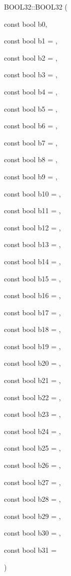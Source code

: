 {\footnotesize\ttfamily B\+O\+O\+L32\+::\+B\+O\+O\+L32 (\begin{DoxyParamCaption}\item[{const bool}]{b0,  }\item[{const bool}]{b1 = {},  }\item[{const bool}]{b2 = {},  }\item[{const bool}]{b3 = {},  }\item[{const bool}]{b4 = {},  }\item[{const bool}]{b5 = {},  }\item[{const bool}]{b6 = {},  }\item[{const bool}]{b7 = {},  }\item[{const bool}]{b8 = {},  }\item[{const bool}]{b9 = {},  }\item[{const bool}]{b10 = {},  }\item[{const bool}]{b11 = {},  }\item[{const bool}]{b12 = {},  }\item[{const bool}]{b13 = {},  }\item[{const bool}]{b14 = {},  }\item[{const bool}]{b15 = {},  }\item[{const bool}]{b16 = {},  }\item[{const bool}]{b17 = {},  }\item[{const bool}]{b18 = {},  }\item[{const bool}]{b19 = {},  }\item[{const bool}]{b20 = {},  }\item[{const bool}]{b21 = {},  }\item[{const bool}]{b22 = {},  }\item[{const bool}]{b23 = {},  }\item[{const bool}]{b24 = {},  }\item[{const bool}]{b25 = {},  }\item[{const bool}]{b26 = {},  }\item[{const bool}]{b27 = {},  }\item[{const bool}]{b28 = {},  }\item[{const bool}]{b29 = {},  }\item[{const bool}]{b30 = {},  }\item[{const bool}]{b31 = {} }\end{DoxyParamCaption})\hspace{0.3cm}{\ttfamily [inline]}}



